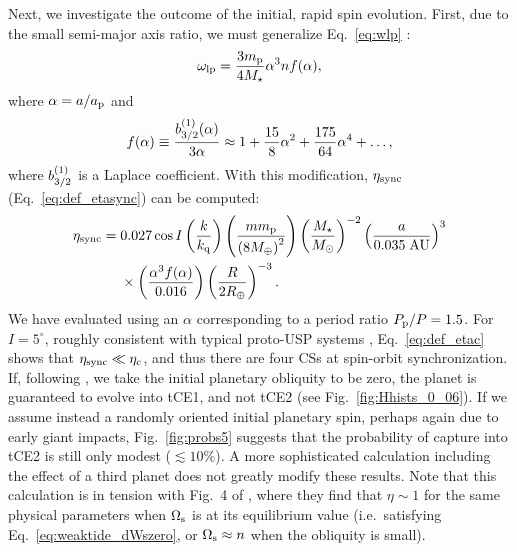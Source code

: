 \documentclass[
        fleqn,
        usenatbib,
    ]{mnras}
\newcommand*{\p}[1]{\left(#1\right)}
\begin{document}
Next, we investigate the outcome of the initial, rapid spin evolution. First,
due to the small semi-major axis ratio, we must generalize Eq.~\eqref{eq:wlp}
\citep{lai_2017}:
\begin{equation}
    \omega_{\rm lp} = \frac{3m_{\rm p}}{4M_{\star}}
        \alpha^3 n f(\alpha),
        \label{eq:def_g_usp}
\end{equation}
where $\alpha = a / a_{\rm p}$ and \citep{murray1999solar}
\begin{equation}
    f(\alpha) \equiv \frac{b_{\rm 3/2}^{(1)}(\alpha)}{3\alpha}
        \approx 1 + \frac{15}{8}\alpha^2 + \frac{175}{64}\alpha^4 + \dots,
\end{equation}
where $b_{\rm 3/2}^{(1)}$ is a Laplace coefficient. With this modification,
$\eta_{\rm sync}$ (Eq.~\ref{eq:def_etasync}) can be computed:
\begin{align}
    \eta_{\rm sync} ={}& 0.027 \cos I
            \p{\frac{k}{k_{\rm q}}}
            \p{\frac{m m_{\rm p}}{\p{8 M_{\oplus}}^2}}
            \p{\frac{M_\star}{M_{\odot}}}^{-2}
            \p{\frac{a}{0.035 \;\mathrm{AU}}}^{3}\nonumber\\
        &\times \p{\frac{\alpha^3 f(\alpha)}{0.016}}
            \p{\frac{R}{2R_{\oplus}}}^{-3}.
            \label{eq:etasync_usp}
\end{align}
We have evaluated using an $\alpha$ corresponding to a period ratio $P_{\rm p} /
P = 1.5$. For $I = 5^\circ$, roughly consistent with typical proto-USP systems
\citep{dai2018larger}, Eq.~\eqref{eq:def_etac} shows that $\eta_{\rm sync} \ll
\eta_{\rm c}$, and thus there are four CSs at spin-orbit synchronization. If,
following \citet{millholland2020formation}, we take the initial planetary
obliquity to be zero, the planet is guaranteed to evolve into tCE1, and not tCE2
(see Fig.~\ref{fig:Hhists_0_06}). If we assume instead a randomly oriented
initial planetary spin, perhaps again due to early giant impacts,
Fig.~\ref{fig:probs5} suggests that the probability of capture into tCE2 is
still only modest ($\lesssim 10\%$). A more sophisticated calculation including
the effect of a third planet does not greatly modify these results. Note that
this calculation is in tension with Fig.~4 of \citet{millholland2020formation},
where they find that $\eta \sim 1$ for the same physical parameters when
$\Omega_{\rm s}$ is at its equilibrium value (i.e.\ satisfying
Eq.~\ref{eq:weaktide_dWszero}, or $\Omega_{\rm s} \approx n$ when the obliquity
is small).
\end{document}
